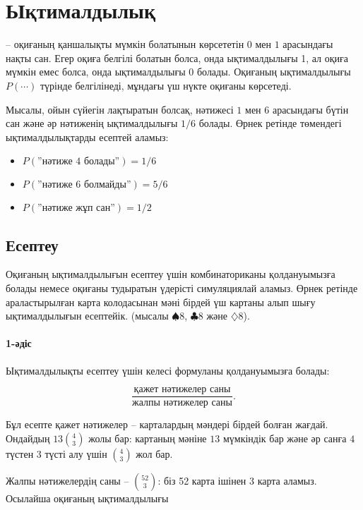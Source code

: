 \chapter{Ықтималдылық}


 -- оқиғаның қаншалықты 
мүмкін болатынын көрсететін
$0$ мен $1$ арасындағы нақты сан. Егер оқиға
белгілі болатын болса, онда ықтималдылығы 1,
ал оқиға мүмкін емес болса,
онда ықтималдылығы 0 болады. Оқиғаның ықтималдылығы 
$P(\cdots)$ түрінде белгілінеді, мұндағы үш нүкте оқиғаны көрсетеді.

Мысалы, ойын сүйегін лақтыратын болсақ,
нәтижесі $1$ мен $6$ арасындағы бүтін сан
және әр нәтиженің ықтималдылығы $1/6$ болады.
Өрнек ретінде төмендегі ықтималдылықтарды есептей 
аламыз:

\begin{itemize}[noitemsep]
\item $P(\textrm{''нәтиже 4 болады''})=1/6$
\item $P(\textrm{''нәтиже 6 болмайды''})=5/6$
\item $P(\textrm{''нәтиже жұп сан''})=1/2$
\end{itemize}

\section{Есептеу}

Оқиғаның ықтималдылығын есептеу үшін комбинаториканы 
қолдануымызға болады немесе оқиғаны тудыратын үдерісті симуляциялай аламыз.
Өрнек ретінде араластырылған карта колодасынан мәні бірдей үш картаны
алып шығу ықтималдылығын есептейік.
(мысалы $\spadesuit 8$, $\clubsuit 8$ және $\diamondsuit 8$).

\subsubsection*{1-әдіс}

Ықтималдылықты есептеу үшін келесі формуланы қолдануымызға болады:

\[\frac{\textrm{қажет нәтижелер саны}}{\textrm{жалпы нәтижелер саны}}.\]

Бұл есепте қажет нәтижелер -- карталардың мәндері 
бірдей болған жағдай. Ондайдың $13 {4 \choose 3}$ жолы бар:
картаның мәніне $13$ мүмкіндік бар және
әр санға $4$ түстен $3$ түсті алу үшін ${4 \choose 3}$ жол бар.

Жалпы нәтижелердің саны -- ${52 \choose 3}$:
біз 52 карта ішінен 3 карта аламыз. Осылайша
оқиғаның ықтималдылығы 

